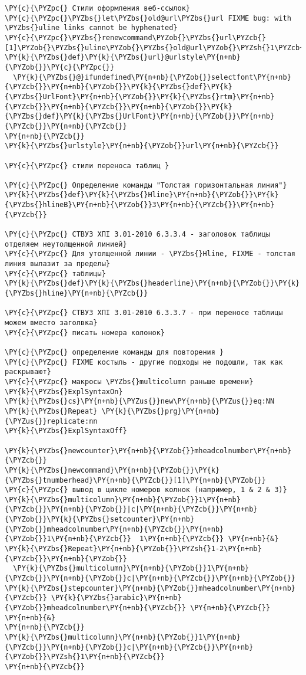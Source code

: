 \begin{Verbatim}[commandchars=\\\{\}]
\PY{c}{\PYZpc{} Стили оформления веб-ссылок}
\PY{c}{\PYZpc{}\PYZbs{}let\PYZbs{}old@url\PYZbs{}url FIXME bug: with \PYZbs{}uline links cannot be hyphenated}
\PY{c}{\PYZpc{}\PYZbs{}renewcommand\PYZob{}\PYZbs{}url\PYZcb{}[1]\PYZob{}\PYZbs{}uline\PYZob{}\PYZbs{}old@url\PYZob{}\PYZsh{}1\PYZcb{}\PYZcb{}\PYZcb{}}
\PY{k}{\PYZbs{}def}\PY{k}{\PYZbs{}url}@urlstyle\PY{n+nb}{\PYZob{}}\PY{c}{\PYZpc{}}
  \PY{k}{\PYZbs{}@}ifundefined\PY{n+nb}{\PYZob{}}selectfont\PY{n+nb}{\PYZcb{}}\PY{n+nb}{\PYZob{}}\PY{k}{\PYZbs{}def}\PY{k}{\PYZbs{}UrlFont}\PY{n+nb}{\PYZob{}}\PY{k}{\PYZbs{}rtm}\PY{n+nb}{\PYZcb{}}\PY{n+nb}{\PYZcb{}}\PY{n+nb}{\PYZob{}}\PY{k}{\PYZbs{}def}\PY{k}{\PYZbs{}UrlFont}\PY{n+nb}{\PYZob{}}\PY{n+nb}{\PYZcb{}}\PY{n+nb}{\PYZcb{}}
\PY{n+nb}{\PYZcb{}}
\PY{k}{\PYZbs{}urlstyle}\PY{n+nb}{\PYZob{}}url\PY{n+nb}{\PYZcb{}}

\PY{c}{\PYZpc{} стили переноса таблиц }

\PY{c}{\PYZpc{} Определение команды "Толстая горизонтальная линия"}
\PY{k}{\PYZbs{}def}\PY{k}{\PYZbs{}Hline}\PY{n+nb}{\PYZob{}}\PY{k}{\PYZbs{}hlineB}\PY{n+nb}{\PYZob{}}3\PY{n+nb}{\PYZcb{}}\PY{n+nb}{\PYZcb{}}

\PY{c}{\PYZpc{} СТВУЗ ХПІ 3.01-2010 6.3.3.4 - заголовок таблицы отделяем неутолщенной линией}
\PY{c}{\PYZpc{} Для утолщенной линии - \PYZbs{}Hline, FIXME - толстая линия вылазит за пределы}
\PY{c}{\PYZpc{} таблицы}
\PY{k}{\PYZbs{}def}\PY{k}{\PYZbs{}headerline}\PY{n+nb}{\PYZob{}}\PY{k}{\PYZbs{}hline}\PY{n+nb}{\PYZcb{}} 

\PY{c}{\PYZpc{} СТВУЗ ХПІ 3.01-2010 6.3.3.7 - при переносе таблицы можем вместо заголвка}
\PY{c}{\PYZpc{} писать номера колонок}

\PY{c}{\PYZpc{} определение команды для повторения }
\PY{c}{\PYZpc{} FIXME костыль - другие подходы не подошли, так как раскрывают}
\PY{c}{\PYZpc{} макросы \PYZbs{}multicolumn раньше времени}
\PY{k}{\PYZbs{}ExplSyntaxOn}
\PY{k}{\PYZbs{}cs}\PY{n+nb}{\PYZus{}}new\PY{n+nb}{\PYZus{}}eq:NN \PY{k}{\PYZbs{}Repeat} \PY{k}{\PYZbs{}prg}\PY{n+nb}{\PYZus{}}replicate:nn
\PY{k}{\PYZbs{}ExplSyntaxOff}

\PY{k}{\PYZbs{}newcounter}\PY{n+nb}{\PYZob{}}mheadcolnumber\PY{n+nb}{\PYZcb{}}
\PY{k}{\PYZbs{}newcommand}\PY{n+nb}{\PYZob{}}\PY{k}{\PYZbs{}tnumberhead}\PY{n+nb}{\PYZcb{}}[1]\PY{n+nb}{\PYZob{}}
\PY{c}{\PYZpc{} вывод в цикле номеров колнок (например, 1 & 2 & 3)}
\PY{k}{\PYZbs{}multicolumn}\PY{n+nb}{\PYZob{}}1\PY{n+nb}{\PYZcb{}}\PY{n+nb}{\PYZob{}}|c|\PY{n+nb}{\PYZcb{}}\PY{n+nb}{\PYZob{}}\PY{k}{\PYZbs{}setcounter}\PY{n+nb}{\PYZob{}}mheadcolnumber\PY{n+nb}{\PYZcb{}}\PY{n+nb}{\PYZob{}}1\PY{n+nb}{\PYZcb{}}  1\PY{n+nb}{\PYZcb{}} \PY{n+nb}{&}
\PY{k}{\PYZbs{}Repeat}\PY{n+nb}{\PYZob{}}\PYZsh{}1-2\PY{n+nb}{\PYZcb{}}\PY{n+nb}{\PYZob{}}
  \PY{k}{\PYZbs{}multicolumn}\PY{n+nb}{\PYZob{}}1\PY{n+nb}{\PYZcb{}}\PY{n+nb}{\PYZob{}}c|\PY{n+nb}{\PYZcb{}}\PY{n+nb}{\PYZob{}} \PY{k}{\PYZbs{}stepcounter}\PY{n+nb}{\PYZob{}}mheadcolnumber\PY{n+nb}{\PYZcb{}} \PY{k}{\PYZbs{}arabic}\PY{n+nb}{\PYZob{}}mheadcolnumber\PY{n+nb}{\PYZcb{}} \PY{n+nb}{\PYZcb{}} \PY{n+nb}{&}
\PY{n+nb}{\PYZcb{}}
\PY{k}{\PYZbs{}multicolumn}\PY{n+nb}{\PYZob{}}1\PY{n+nb}{\PYZcb{}}\PY{n+nb}{\PYZob{}}c|\PY{n+nb}{\PYZcb{}}\PY{n+nb}{\PYZob{}}\PYZsh{}1\PY{n+nb}{\PYZcb{}}
\PY{n+nb}{\PYZcb{}}


\end{Verbatim}
